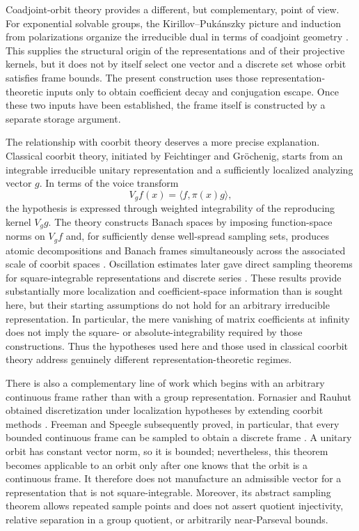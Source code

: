 \documentclass[10pt,a4paper]{amsart}
\numberwithin{equation}{section}
\begin{document}
Coadjoint-orbit theory provides a different, but complementary, point of
view.  For exponential solvable
groups, the Kirillov--Puk\'anszky picture and induction from polarizations
organize the irreducible dual in terms of coadjoint geometry
\cite{Pukanszky1968,ArnalCurrey2020}.  This supplies the structural origin of
the representations and of their projective kernels, but it does not by
itself select one vector and a discrete set whose orbit satisfies frame
bounds.  The present construction uses those representation-theoretic inputs
only to obtain coefficient decay and conjugation escape.  Once these two
inputs have been established, the frame itself is constructed by a separate
storage argument.

The relationship with coorbit theory deserves a more precise explanation.
Classical coorbit theory, initiated by Feichtinger and Gr\"ochenig, starts
from an integrable irreducible unitary representation and a sufficiently
localized analyzing vector $g$.  In terms of the voice transform
\[
   V_gf(x)=\langle f,\pi(x)g\rangle,
\]
the hypothesis is expressed through weighted integrability of the reproducing
kernel $V_gg$.  The theory constructs Banach spaces by imposing function-space
norms on $V_gf$ and, for sufficiently dense well-spread sampling sets,
produces atomic decompositions and Banach frames simultaneously across the
associated scale of coorbit spaces
\cite{FeichtingerGrochenig1988,FeichtingerGrochenig1989I,
FeichtingerGrochenig1989II}.  Oscillation estimates later gave direct sampling
theorems for square-integrable representations and discrete series
\cite{FuehrGrochenig2007}.  These results provide substantially more
localization and coefficient-space information than is sought here, but their
starting assumptions do not hold for an arbitrary irreducible representation.
In particular, the mere vanishing of matrix coefficients at infinity does
not imply the square- or absolute-integrability required by those
constructions.  Thus the hypotheses used here and those used in classical
coorbit theory address genuinely different representation-theoretic regimes.

There is also a complementary line of work which begins with an arbitrary
continuous frame rather than with a group representation.  Fornasier and
Rauhut obtained discretization
under localization hypotheses by extending coorbit methods
\cite{FornasierRauhut2005}.  Freeman and Speegle subsequently proved, in
particular, that every bounded continuous frame can be sampled to obtain a
discrete frame \cite{FreemanSpeegle2019}.  A unitary orbit has constant vector
norm, so it is bounded; nevertheless, this theorem becomes applicable to an
orbit only after one knows that the orbit is a continuous frame.  It therefore
does not manufacture an admissible vector for a representation that is not
square-integrable.  Moreover, its abstract sampling theorem allows repeated
sample points and does not assert quotient injectivity, relative separation
in a group quotient, or arbitrarily near-Parseval bounds.
\end{document}
